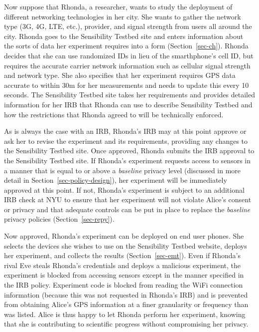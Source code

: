 Now suppose that Rhonda, a researcher, wants to study the deployment of
different networking technologies in her city.  She wants to gather
the network type (3G, 4G, LTE, etc.), provider, and signal strength from
users all around the city.  Rhonda goes to the Sensibility Testbed site
and enters information about the sorts of data her experiment requires
into a form (Section~\ref{sec-ch}).  Rhonda decides that she can use randomized IDs in lieu 
of the smarthphone's cell ID, but requires the accurate carrier 
network information such as cellular signal strength and network type. 
She also specifies that her experiment requires GPS data accurate to within
30m for her measurements and needs to update this every 10 seconds.
The Sensibility Testbed site takes her requirements and provides detailed
information for her IRB that Rhonda can use to describe Sensibility
Testbed and how the restrictions that Rhonda agreed to will be technically
enforced.

As is always the case with an IRB, Rhonda's IRB may at this point approve 
or ask her to revise the experiment and its requirements, providing any
changes to the Sensibility Testbed site.  Once approved, Rhonda submits 
the IRB approval to the Sensibility Testbed site.  If 
Rhonda's experiment requests access to sensors in a manner that is 
equal to or above a \emph{baseline} privacy level (discussed in more detail
in Section~\ref{sec-policy-design}), her experiment will be immediately approved at this point.
If not, Rhonda's experiment is subject to an additional IRB check at NYU 
to ensure that her experiment will not violate Alice's consent or privacy and
that adequate controls can be put in place to replace the \emph{baseline}
privacy policies (Section~\ref{sec-repy}).

Now approved, Rhonda's experiment can be deployed on end user phones.  She
selects the devices she wishes to use on the Sensibility Testbed 
website, deploys her experiment, and collects the results (Section~\ref{sec-emt}).  
Even if Rhonda's rival Eve steals Rhonda's credentials and deploys a
malicious experiment, the experiment is blocked from accessing sensors except 
in the manner specified in the IRB policy.  Experiment code is blocked from 
reading the WiFi connection information (because this was not requested in
Rhonda's IRB) and is prevented from obtaining Alice's GPS information at a 
finer granularity or frequency than was listed. 
Alice is thus happy to let Rhonda perform her experiment, 
knowing that she is contributing to scientific progress without compromising 
her privacy. 


